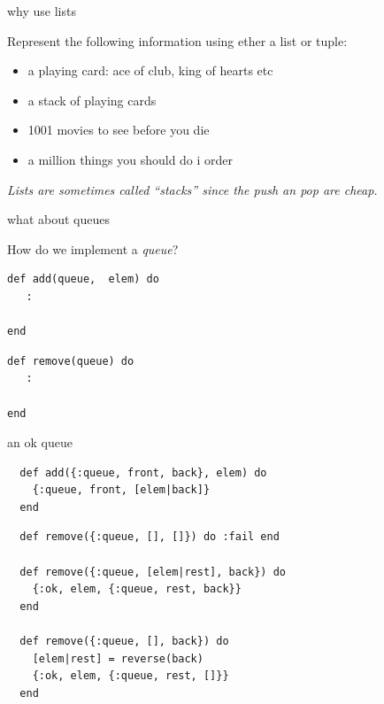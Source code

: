 \begin{frame}[fragile]{why use lists}

Represent the following information using ether a list or tuple:
                   
\begin{itemize}
\pause \item a playing card: ace of club, king of hearts etc 
\pause \item a stack of playing cards
\pause \item 1001 movies to see before you die
\pause \item a million things you should do i order
\end{itemize}

\pause\vspace{20pt}
{\em Lists are sometimes called ``stacks'' since the push an pop are cheap.}
\end{frame}

\begin{frame}[fragile]{what about queues}


  How do we implement a {\em queue}?

\begin{verbatim}
def add(queue,  elem) do
   :

end
\end{verbatim}

\begin{verbatim}
def remove(queue) do
   :

end
\end{verbatim}  
  
\end{frame}

\begin{frame}[fragile]{an ok queue}

\begin{verbatim}
  def add({:queue, front, back}, elem) do
    {:queue, front, [elem|back]}
  end
\end{verbatim}

\begin{verbatim}
  def remove({:queue, [], []}) do :fail end

  def remove({:queue, [elem|rest], back}) do
    {:ok, elem, {:queue, rest, back}}
  end

  def remove({:queue, [], back}) do
    [elem|rest] = reverse(back)
    {:ok, elem, {:queue, rest, []}}
  end
\end{verbatim}
  
\end{frame}


